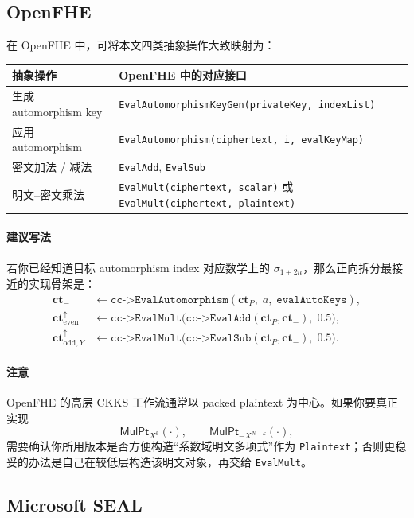 \documentclass[11pt,a4paper]{ctexart}
\newcommand{\MulPt}[1]{\mathsf{MulPt}_{#1}}
\newcommand{\ctP}{\mathbf{ct}_{P}}
\newcommand{\ctm}{\mathbf{ct}_{-}}
\newcommand{\cte}{\mathbf{ct}_{\mathrm{even}}^{\uparrow}}
\newcommand{\ctoy}{\mathbf{ct}_{\mathrm{odd},Y}^{\uparrow}}
\begin{document}
\subsection{OpenFHE}

在 OpenFHE 中，可将本文四类抽象操作大致映射为：

\begin{center}
\begin{tabular}{>{\raggedright\arraybackslash}p{} >{\raggedright\arraybackslash}p{}}
\toprule
抽象操作 & OpenFHE 中的对应接口 \\ \midrule
生成 automorphism key &
\texttt{EvalAutomorphismKeyGen(privateKey, indexList)} \\[4pt]
应用 automorphism &
\texttt{EvalAutomorphism(ciphertext, i, evalKeyMap)} \\[4pt]
密文加法 / 减法 &
\texttt{EvalAdd}, \texttt{EvalSub} \\[4pt]
明文--密文乘法 &
\texttt{EvalMult(ciphertext, scalar)} 或 \texttt{EvalMult(ciphertext, plaintext)} \\[4pt]
\bottomrule
\end{tabular}
\end{center}

\paragraph{建议写法}
若你已经知道目标 automorphism index 对应数学上的 \(\sigma_{1+2n}\)，那么正向拆分最接近的实现骨架是：
\begin{align*}
\ctm &\leftarrow \texttt{cc->EvalAutomorphism}(\ctP,\; a,\; \texttt{evalAutoKeys}),\\
\cte &\leftarrow \texttt{cc->EvalMult}\bigl(\texttt{cc->EvalAdd}(\ctP,\ctm),\; 0.5\bigr),\\
\ctoy &\leftarrow \texttt{cc->EvalMult}\bigl(\texttt{cc->EvalSub}(\ctP,\ctm),\; 0.5\bigr).
\end{align*}

\paragraph{注意}
OpenFHE 的高层 CKKS 工作流通常以 packed plaintext 为中心。如果你要真正实现
\[
\MulPt{X^k}(\cdot),\qquad \MulPt{-X^{N-k}}(\cdot),
\]
需要确认你所用版本是否方便构造“系数域明文多项式”作为 \texttt{Plaintext}；否则更稳妥的办法是自己在较低层构造该明文对象，再交给 \texttt{EvalMult}。

\subsection{Microsoft SEAL}
\end{document}
